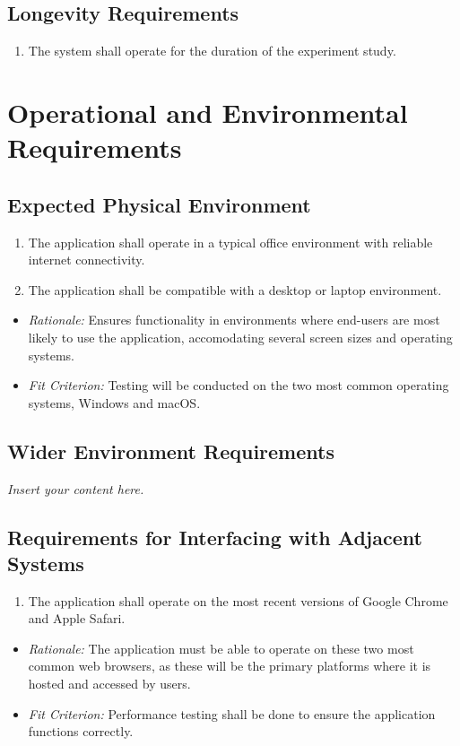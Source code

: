 \documentclass[12pt]{article}
\newcommand{\lips}{\textit{Insert your content here.}}
\begin{document}
\subsection{Longevity Requirements}
\begin{enumerate}
  \item The system shall operate for the duration of the experiment study.
\end{enumerate}

\section{Operational and Environmental Requirements}
\subsection{Expected Physical Environment}
\begin{enumerate}
  \item The application shall operate in a typical office environment with
  reliable internet connectivity.
  \item The application shall be compatible with a desktop or laptop
  environment.
\end{enumerate}
\begin{itemize}
  \item \textit{Rationale:} Ensures functionality in environments where
  end-users are most likely to use the application, accomodating several screen
  sizes and operating systems. 
  \item \textit{Fit Criterion:} Testing will be conducted on the two most common
  operating systems, Windows and macOS.
\end{itemize}

\subsection{Wider Environment Requirements}
\lips

\subsection{Requirements for Interfacing with Adjacent Systems}
\begin{enumerate}
  \item The application shall operate on the most recent versions of Google
  Chrome and Apple Safari.
\end{enumerate}
\begin{itemize}
  \item \textit{Rationale:} The application must be able to operate on these two
  most common web browsers, as these will be the primary platforms where it is
  hosted and accessed by users.
  \item \textit{Fit Criterion:} Performance testing shall be done to ensure the
  application functions correctly.
\end{itemize}
\end{document}
